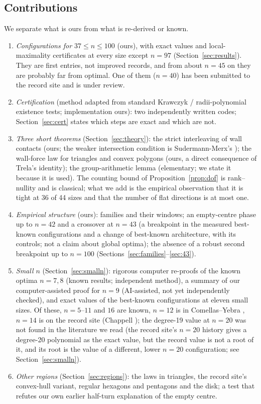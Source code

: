 \documentclass[11pt]{amsart}
\theoremstyle{definition}
\begin{document}
\subsection*{Contributions}
We separate what is ours from what is re-derived or known.
\begin{enumerate}[label=(\arabic*)]
\item \emph{Configurations for $37 \le n \le 100$} (ours), with exact values and local-maximality certificates at every size except $n = 97$ (Section~\ref{sec:results}). They are first entries, not improved records, and from about $n = 45$ on they are probably far from optimal. One of them ($n = 40$) has been submitted to the record site and is under review. %
\item \emph{Certification} (method adapted from standard Krawczyk / radii-polynomial existence tests; implementation ours): two independently written codes; Section~\ref{sec:cert} states which steps are exact and which are not.
\item \emph{Three short theorems} (Section~\ref{sec:theory}): the strict interleaving of wall contacts (ours; the weaker intersection condition is Sudermann-Merx's \cite[Lemma~2(C)]{SM}); the wall-force law for triangles and convex polygons (ours, a direct consequence of Trela's identity); the group-arithmetic lemma (elementary; we state it because it is used). The counting bound of Proposition~\ref{prop:dof} is rank--nullity and is classical; what we add is the empirical observation that it is tight at 36 of 44 sizes and that the number of flat directions is at most one.
\item \emph{Empirical structure} (ours): families and their windows; an empty-centre phase up to $n = 42$ and a crossover at $n = 43$ (a breakpoint in the measured best-known configurations and a change of best-known architecture, with its controls; not a claim about global optima); the absence of a robust second breakpoint up to $n = 100$ (Sections~\ref{sec:families}--\ref{sec:43}).
\item \emph{Small $n$} (Section~\ref{sec:smalln}): rigorous computer re-proofs of the known optima $n = 7, 8$ (known results; independent method), a summary of our computer-assisted proof for $n = 9$ \cite{N9} (AI-assisted, not yet independently checked), and exact values of the best-known configurations at eleven small sizes. Of these, $n = 5$--$11$ and $16$ are known, $n = 12$ is in Comellas--Yebra \cite{CY}, $n = 14$ is on the record site (Chappell \cite{Chappell}); the degree-19 value at $n = 20$ was not found in the literature we read (the record site's $n = 20$ history gives a degree-20 polynomial as the exact value, but the record value is not a root of it, and its root is the value of a different, lower $n = 20$ configuration; see Section~\ref{sec:smalln}).
\item \emph{Other regions} (Section~\ref{sec:regions}): the laws in triangles, the record site's convex-hull variant, regular hexagons and pentagons and the disk; a test that refutes our own earlier half-turn explanation of the empty centre.
\end{enumerate}
\end{document}
